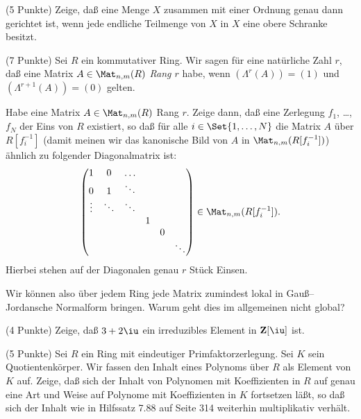 \documentclass{algsheet}
\begin{document}
\begin{exercise}(5 Punkte)\newline
    Zeige, daß eine Menge \(X\) zusammen mit einer Ordnung genau dann gerichtet
    ist, wenn jede endliche Teilmenge von \(X\) in $X$ eine obere Schranke besitzt.
\end{exercise}


\begin{exercise}(7 Punkte)\newline
    Sei \(R\) ein kommutativer Ring. Wir sagen für eine natürliche Zahl \(r\), 
    daß eine Matrix \(A \in \Mat_{n, m}(R)\)
    \emph{Rang \(r\)} habe, wenn \((\Lambda^r(A)) = (1)\) und \((\Lambda^{r + 1}(A)) = (0)\)
    gelten.
    
    Habe eine Matrix \(A \in \Mat_{n, m}(R)\) Rang \(r\). Zeige dann, daß eine Zerlegung \(f_1\), \dots,
    \(f_N\) der Eins von \(R\) existiert, so daß für alle \(i \in \Set{1, \dotsc,
    N}\) die Matrix \(A\) über \(R[f_i^{-1}]\)
    (damit meinen wir das kanonische Bild von \(A\) in \(\Mat_{n, m}(R[f_i^{-1}])\)) ähnlich
    zu folgender Diagonalmatrix ist:
    \begin{equation}
        \begin{pmatrix}
            1    & 0      & \dots  \\
            0      & 1    & \ddots \\
            \vdots & \ddots & \ddots \\
                   &        &        & 1 \\
                   &        &        &      & 0 \\
                   &        &        &      &   & \ddots
        \end{pmatrix}
        \in \Mat_{n, m}(R[f_i^{-1}]).
    \end{equation}
    Hierbei stehen auf der Diagonalen genau \(r\) Stück Einsen.
        
    Wir können also über jedem Ring jede Matrix zumindest lokal in Gauß--Jordansche Normalform 
    bringen. Warum geht dies im allgemeinen nicht global?
\end{exercise}



\begin{exercise}(4 Punkte)\newline
    Zeige, daß \(3 + 2 \iu\) ein irreduzibles Element in \(\set Z[\iu]\) ist.
\end{exercise}


\begin{exercise}(5 Punkte)\newline
    Sei \(R\) ein Ring mit eindeutiger Primfaktorzerlegung. 
    Sei \(K\) sein Quotientenkörper. Wir fassen den Inhalt eines Polynoms
    über \(R\) als Element von \(K\) auf.
    Zeige, daß sich
    der Inhalt von Polynomen mit Koeffizienten in \(R\) auf genau eine Art und
    Weise auf Polynome mit Koeffizienten in \(K\) fortsetzen läßt, so daß sich
    der Inhalt wie in Hilfssatz 7.88 auf Seite 314 weiterhin multiplikativ verhält.
\end{exercise}
\end{document}
